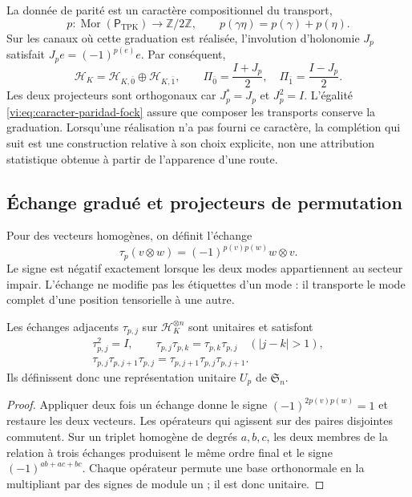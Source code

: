 La donnée de parité est un caractère compositionnel du transport,
\begin{equation}
 p:\operatorname{Mor}(\mathsf P_{\mathrm{TPK}})
 \longrightarrow\mathbb Z/2\mathbb Z,
 \qquad p(\gamma\eta)=p(\gamma)+p(\eta).
 \label{vi:eq:caracter-paridad-fock}
\end{equation}
Sur les canaux où cette graduation est réalisée,
l’involution d’holonomie \(J_p\) satisfait
\(J_pe=(-1)^{p(e)}e\). Par conséquent,
\[
 \mathcal H_K=\mathcal H_{K,\bar0}\oplus\mathcal H_{K,\bar1},
 \qquad \Pi_{\bar0}=\frac{I+J_p}{2},\quad
 \Pi_{\bar1}=\frac{I-J_p}{2}.
\]
Les deux projecteurs sont orthogonaux car \(J_p^*=J_p\) et
\(J_p^2=I\). L’égalité \eqref{vi:eq:caracter-paridad-fock} assure
que composer les transports conserve la graduation. Lorsqu’une réalisation
n’a pas fourni ce caractère, la complétion qui suit est une
construction relative à son choix explicite, non une attribution
statistique obtenue à partir de l’apparence d’une route.

\subsection{Échange gradué et projecteurs de permutation}
\label{vi:subsec:intercambio-graduado}

Pour des vecteurs homogènes, on définit l’échange
\begin{equation}
 \tau_p(v\otimes w)=(-1)^{p(v)p(w)}w\otimes v.
 \label{vi:eq:intercambio-graduado}
\end{equation}
Le signe est négatif exactement lorsque les deux modes appartiennent au
secteur impair. L’échange ne modifie pas les étiquettes d’un mode :
il transporte le mode complet d’une position tensorielle à une autre.

\begin{proposition}
\label{vi:prop:permutaciones-graduadas}
Les échanges adjacents \(\tau_{p,j}\) sur
\(\mathcal H_K^{\otimes n}\) sont unitaires et satisfont
\[
\begin{gathered}
 \tau_{p,j}^2=I,\qquad
 \tau_{p,j}\tau_{p,k}=\tau_{p,k}\tau_{p,j}\quad(|j-k|>1),\\
 \tau_{p,j}\tau_{p,j+1}\tau_{p,j}
 =\tau_{p,j+1}\tau_{p,j}\tau_{p,j+1}.
\end{gathered}
\]
Ils définissent donc une représentation unitaire \(U_p\) de
\(\mathfrak S_n\).
\end{proposition}
\begin{proof}
Appliquer deux fois un échange donne le signe
\((-1)^{2p(v)p(w)}=1\) et restaure les deux vecteurs. Les opérateurs
qui agissent sur des paires disjointes commutent. Sur un triplet homogène
de degrés \(a,b,c\), les deux membres de la relation à trois
échanges produisent le même ordre final et le signe
\((-1)^{ab+ac+bc}\). Chaque opérateur permute une base orthonormale
en la multipliant par des signes de module un ; il est donc unitaire.
\end{proof}

